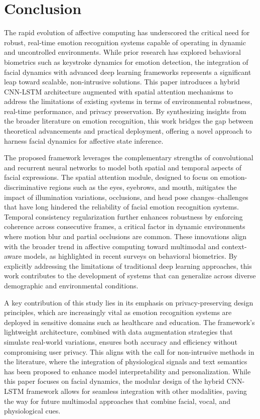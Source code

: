 \documentclass[conference]{IEEEtran}
\begin{document}
\section{Conclusion}

The rapid evolution of affective computing has underscored the critical need for robust, real-time emotion recognition systems capable of operating in dynamic and uncontrolled environments. While prior research has explored behavioral biometrics such as keystroke dynamics for emotion detection, the integration of facial dynamics with advanced deep learning frameworks represents a significant leap toward scalable, non-intrusive solutions. This paper introduces a hybrid CNN-LSTM architecture augmented with spatial attention mechanisms to address the limitations of existing systems in terms of environmental robustness, real-time performance, and privacy preservation. By synthesizing insights from the broader literature on emotion recognition, this work bridges the gap between theoretical advancements and practical deployment, offering a novel approach to harness facial dynamics for affective state inference.  

The proposed framework leverages the complementary strengths of convolutional and recurrent neural networks to model both spatial and temporal aspects of facial expressions. The spatial attention module, designed to focus on emotion-discriminative regions such as the eyes, eyebrows, and mouth, mitigates the impact of illumination variations, occlusions, and head pose changes--challenges that have long hindered the reliability of facial emotion recognition systems. Temporal consistency regularization further enhances robustness by enforcing coherence across consecutive frames, a critical factor in dynamic environments where motion blur and partial occlusions are common. These innovations align with the broader trend in affective computing toward multimodal and context-aware models, as highlighted in recent surveys on behavioral biometrics. By explicitly addressing the limitations of traditional deep learning approaches, this work contributes to the development of systems that can generalize across diverse demographic and environmental conditions.  

A key contribution of this study lies in its emphasis on privacy-preserving design principles, which are increasingly vital as emotion recognition systems are deployed in sensitive domains such as healthcare and education. The framework's lightweight architecture, combined with data augmentation strategies that simulate real-world variations, ensures both accuracy and efficiency without compromising user privacy. This aligns with the call for non-intrusive methods in the literature, where the integration of physiological signals and text semantics has been proposed to enhance model interpretability and personalization. While this paper focuses on facial dynamics, the modular design of the hybrid CNN-LSTM framework allows for seamless integration with other modalities, paving the way for future multimodal approaches that combine facial, vocal, and physiological cues.  
\end{document}
